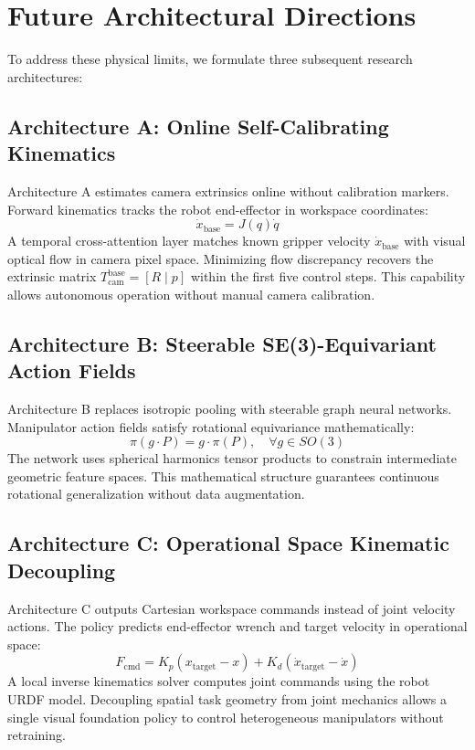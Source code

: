 \documentclass[conference]{IEEEtran}
\begin{document}
\section{Future Architectural Directions}
To address these physical limits, we formulate three subsequent research architectures:

\subsection{Architecture A: Online Self-Calibrating Kinematics}
Architecture A estimates camera extrinsics online without calibration markers. Forward kinematics tracks the robot end-effector in workspace coordinates:
\begin{equation}
\dot{x}_{\text{base}} = J(q) \dot{q}
\label{eq_fk}
\end{equation}
A temporal cross-attention layer matches known gripper velocity $\dot{x}_{\text{base}}$ with visual optical flow in camera pixel space. Minimizing flow discrepancy recovers the extrinsic matrix $T_{\text{cam}}^{\text{base}} = [R \mid p]$ within the first five control steps. This capability allows autonomous operation without manual camera calibration.

\subsection{Architecture B: Steerable SE(3)-Equivariant Action Fields}
Architecture B replaces isotropic pooling with steerable graph neural networks. Manipulator action fields satisfy rotational equivariance mathematically:
\begin{equation}
\pi(g \cdot P) = g \cdot \pi(P), \quad \forall g \in SO(3)
\label{eq_equivariance}
\end{equation}
The network uses spherical harmonics tensor products to constrain intermediate geometric feature spaces. This mathematical structure guarantees continuous rotational generalization without data augmentation.

\subsection{Architecture C: Operational Space Kinematic Decoupling}
Architecture C outputs Cartesian workspace commands instead of joint velocity actions. The policy predicts end-effector wrench and target velocity in operational space:
\begin{equation}
F_{\text{cmd}} = K_p (x_{\text{target}} - x) + K_d (\dot{x}_{\text{target}} - \dot{x})
\label{eq_operational}
\end{equation}
A local inverse kinematics solver computes joint commands using the robot URDF model. Decoupling spatial task geometry from joint mechanics allows a single visual foundation policy to control heterogeneous manipulators without retraining.
\end{document}
